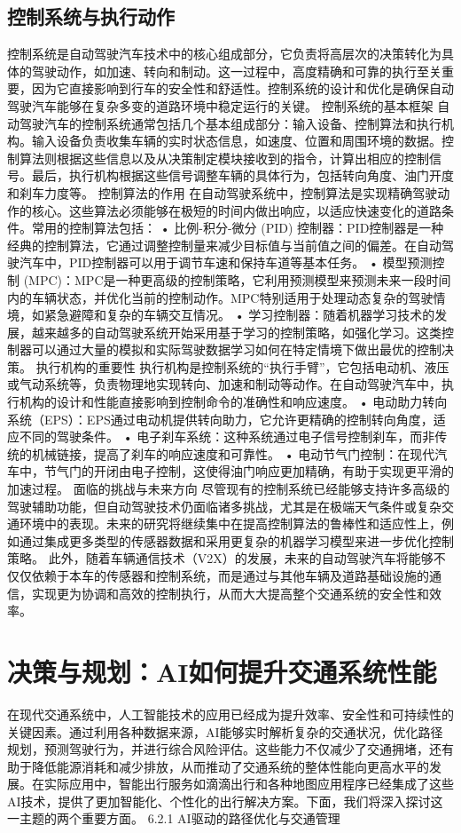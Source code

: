 \subsection{控制系统与执行动作} 
控制系统是自动驾驶汽车技术中的核心组成部分，它负责将高层次的决策转化为具体的驾驶动作，如加速、转向和制动。这一过程中，高度精确和可靠的执行至关重要，因为它直接影响到行车的安全性和舒适性。控制系统的设计和优化是确保自动驾驶汽车能够在复杂多变的道路环境中稳定运行的关键。
控制系统的基本框架
自动驾驶汽车的控制系统通常包括几个基本组成部分：输入设备、控制算法和执行机构。输入设备负责收集车辆的实时状态信息，如速度、位置和周围环境的数据。控制算法则根据这些信息以及从决策制定模块接收到的指令，计算出相应的控制信号。最后，执行机构根据这些信号调整车辆的具体行为，包括转向角度、油门开度和刹车力度等。
控制算法的作用
在自动驾驶系统中，控制算法是实现精确驾驶动作的核心。这些算法必须能够在极短的时间内做出响应，以适应快速变化的道路条件。常用的控制算法包括：
•	比例-积分-微分 (PID) 控制器：PID控制器是一种经典的控制算法，它通过调整控制量来减少目标值与当前值之间的偏差。在自动驾驶汽车中，PID控制器可以用于调节车速和保持车道等基本任务。
•	模型预测控制 (MPC)：MPC是一种更高级的控制策略，它利用预测模型来预测未来一段时间内的车辆状态，并优化当前的控制动作。MPC特别适用于处理动态复杂的驾驶情境，如紧急避障和复杂的车辆交互情况。
•	学习控制器：随着机器学习技术的发展，越来越多的自动驾驶系统开始采用基于学习的控制策略，如强化学习。这类控制器可以通过大量的模拟和实际驾驶数据学习如何在特定情境下做出最优的控制决策。
执行机构的重要性
执行机构是控制系统的“执行手臂”，它包括电动机、液压或气动系统等，负责物理地实现转向、加速和制动等动作。在自动驾驶汽车中，执行机构的设计和性能直接影响到控制命令的准确性和响应速度。
•	电动助力转向系统（EPS）：EPS通过电动机提供转向助力，它允许更精确的控制转向角度，适应不同的驾驶条件。
•	电子刹车系统：这种系统通过电子信号控制刹车，而非传统的机械链接，提高了刹车的响应速度和可靠性。
•	电动节气门控制：在现代汽车中，节气门的开闭由电子控制，这使得油门响应更加精确，有助于实现更平滑的加速过程。
面临的挑战与未来方向
尽管现有的控制系统已经能够支持许多高级的驾驶辅助功能，但自动驾驶技术仍面临诸多挑战，尤其是在极端天气条件或复杂交通环境中的表现。未来的研究将继续集中在提高控制算法的鲁棒性和适应性上，例如通过集成更多类型的传感器数据和采用更复杂的机器学习模型来进一步优化控制策略。
此外，随着车辆通信技术（V2X）的发展，未来的自动驾驶汽车将能够不仅仅依赖于本车的传感器和控制系统，而是通过与其他车辆及道路基础设施的通信，实现更为协调和高效的控制执行，从而大大提高整个交通系统的安全性和效率。
\section{决策与规划：AI如何提升交通系统性能} 
在现代交通系统中，人工智能技术的应用已经成为提升效率、安全性和可持续性的关键因素。通过利用各种数据来源，AI能够实时解析复杂的交通状况，优化路径规划，预测驾驶行为，并进行综合风险评估。这些能力不仅减少了交通拥堵，还有助于降低能源消耗和减少排放，从而推动了交通系统的整体性能向更高水平的发展。在实际应用中，智能出行服务如滴滴出行和各种地图应用程序已经集成了这些AI技术，提供了更加智能化、个性化的出行解决方案。下面，我们将深入探讨这一主题的两个重要方面。
6.2.1 AI驱动的路径优化与交通管理

